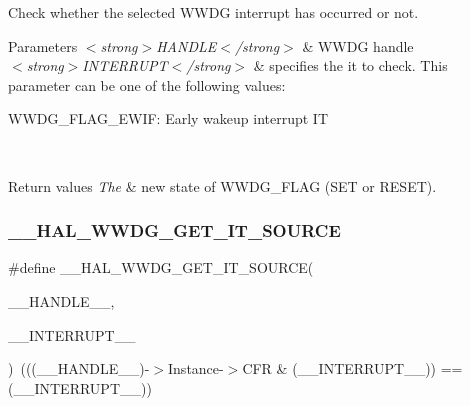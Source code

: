 Check whether the selected W\+W\+DG interrupt has occurred or not. 


\begin{DoxyParams}{Parameters}
{\em $<$strong$>$\+H\+A\+N\+D\+L\+E$<$/strong$>$} & W\+W\+DG handle \\
\hline
{\em $<$strong$>$\+I\+N\+T\+E\+R\+R\+U\+P\+T$<$/strong$>$} & specifies the it to check. This parameter can be one of the following values\+: \begin{DoxyItemize}
\item W\+W\+D\+G\+\_\+\+F\+L\+A\+G\+\_\+\+E\+W\+IF\+: Early wakeup interrupt IT \end{DoxyItemize}
\\
\hline
\end{DoxyParams}

\begin{DoxyRetVals}{Return values}
{\em The} & new state of W\+W\+D\+G\+\_\+\+F\+L\+AG (S\+ET or R\+E\+S\+ET). \\
\hline
\end{DoxyRetVals}
\mbox{\label{group___w_w_d_g___exported___macros_gaa3dae290aeb528ba7dbd1e7f481ef139}} 
\subsubsection{\texorpdfstring{\+\_\+\+\_\+\+H\+A\+L\+\_\+\+W\+W\+D\+G\+\_\+\+G\+E\+T\+\_\+\+I\+T\+\_\+\+S\+O\+U\+R\+CE}{\_\_HAL\_WWDG\_GET\_IT\_SOURCE}}
{\footnotesize\ttfamily \#define \+\_\+\+\_\+\+H\+A\+L\+\_\+\+W\+W\+D\+G\+\_\+\+G\+E\+T\+\_\+\+I\+T\+\_\+\+S\+O\+U\+R\+CE(\begin{DoxyParamCaption}\item[{}]{\+\_\+\+\_\+\+H\+A\+N\+D\+L\+E\+\_\+\+\_\+,  }\item[{}]{\+\_\+\+\_\+\+I\+N\+T\+E\+R\+R\+U\+P\+T\+\_\+\+\_\+ }\end{DoxyParamCaption})~(((\+\_\+\+\_\+\+H\+A\+N\+D\+L\+E\+\_\+\+\_\+)-\/$>$Instance-\/$>$C\+FR \& (\+\_\+\+\_\+\+I\+N\+T\+E\+R\+R\+U\+P\+T\+\_\+\+\_\+)) == (\+\_\+\+\_\+\+I\+N\+T\+E\+R\+R\+U\+P\+T\+\_\+\+\_\+))}



